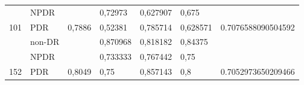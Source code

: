 \begin{table}[H]
\begin{center}
\begin{tabular}{|c|l|c|l|l|l|c|}
			& NPDR                                               &                          & 0,72973  & 0,627907 & 0,675    &                                      \\ \cline{2-2} \cline{4-6}
			\multirow{-3}{*}{101} & PDR                                                & \multirow{-3}{*}{0,7886} & 0,52381  & 0,785714 & 0,628571 & \multirow{-3}{*}{0.7076588090504592} \\ \hline
			& non-DR                                             &                          & 0,870968 & 0,818182 & 0,84375  &                                      \\ \cline{2-2} \cline{4-6}
			& NPDR                                               &                          & 0,733333 & 0,767442 & 0,75     &                                      \\ \cline{2-2} \cline{4-6}
			\multirow{-3}{*}{152} & PDR                                                & \multirow{-3}{*}{0,8049} & 0,75     & 0,857143 & 0,8      & \multirow{-3}{*}{0.7052973650209466} \\ \hline
		\end{tabular}
	\end{center}
\end{table}

